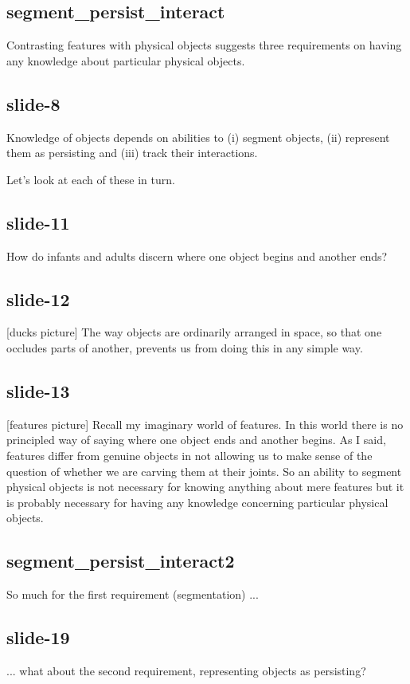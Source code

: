 \documentclass[12pt,\papersize]{extarticle}
\begin{document}
\subsection{segment\_persist\_interact}
Contrasting features with physical objects suggests three requirements on having any 
knowledge about particular physical objects.
 
\subsection{slide-8}
Knowledge of objects depends on abilities to (i) segment objects, (ii) represent them as 
persisting and (iii) track their interactions.
 
Let's look at each of these in turn.
 
\subsection{slide-11}
How do infants and adults discern where one object begins and another ends?
 
\subsection{slide-12}
[ducks picture]
The way objects are ordinarily arranged in space, so that one occludes parts of another, 
prevents us from doing this in any simple way.
 
\subsection{slide-13}
[features picture]
Recall my imaginary world of features.  In this world there is no principled way of saying 
where one object ends and another begins.
As I said, features differ from genuine objects in not allowing us to make sense of the question of 
whether we are carving them at their joints.
So an ability to segment physical objects is not necessary for knowing anything about
mere features but it is probably necessary for having any knowledge 
concerning particular physical objects.
 
\subsection{segment\_persist\_interact2}
So much for the first requirement (segmentation) ...
 
\subsection{slide-19}
... what about the second requirement, representing objects as persisting?
 
\end{document}
